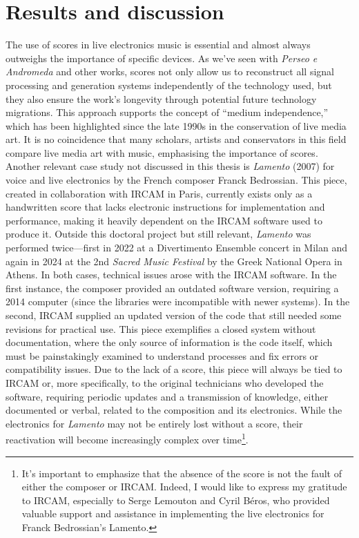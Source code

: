 \section{Results and discussion}
The use of scores in live electronics music is essential and almost always outweighs the importance of specific devices. As we’ve seen with \textit{Perseo e Andromeda} and other works, scores not only allow us to reconstruct all signal processing and generation systems independently of the technology used, but they also ensure the work's longevity through potential future technology migrations. This approach supports the concept of ``medium independence,'' which has been highlighted since the late 1990s in the conservation of live media art. It is no coincidence that many scholars, artists and conservators in this field compare live media art with music, emphasising the importance of scores.\\
Another relevant case study not discussed in this thesis is \textit{Lamento} (2007) for voice and live electronics by the French composer Franck Bedrossian. This piece, created in collaboration with IRCAM in Paris, currently exists only as a handwritten score that lacks electronic instructions for implementation and performance, making it heavily dependent on the IRCAM software used to produce it. Outside this doctoral project but still relevant, \textit{Lamento} was performed twice—first in 2022 at a Divertimento Ensemble concert in Milan and again in 2024 at the 2nd \textit{Sacred Music Festival} by the Greek National Opera in Athens. In both cases, technical issues arose with the IRCAM software. In the first instance, the composer provided an outdated software version, requiring a 2014 computer (since the libraries were incompatible with newer systems). In the second, IRCAM supplied an updated version of the code that still needed some revisions for practical use. This piece exemplifies a closed system without documentation, where the only source of information is the code itself, which must be painstakingly examined to understand processes and fix errors or compatibility issues. Due to the lack of a score, this piece will always be tied to IRCAM or, more specifically, to the original technicians who developed the software, requiring periodic updates and a transmission of knowledge, either documented or verbal, related to the composition and its electronics. While the electronics for \textit{Lamento} may not be entirely lost without a score, their reactivation will become increasingly complex over time\footnote{It's important to emphasize that the absence of the score is not the fault of either the composer or IRCAM. Indeed, I would like to express my gratitude to IRCAM, especially to Serge Lemouton and Cyril Béros, who provided valuable support and assistance in implementing the live electronics for Franck Bedrossian’s Lamento.}.\\
